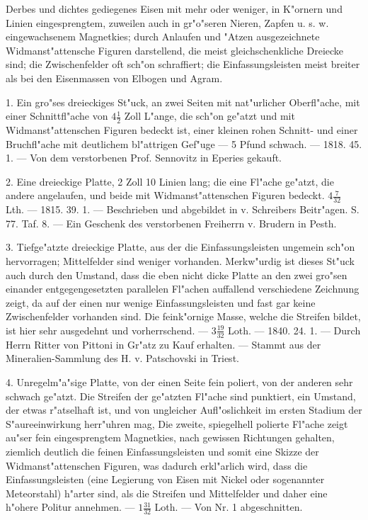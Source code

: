 \documentclass[a4paper, 11pt, oneside, polutonikogreek, german]{article}
\begin{document}
Derbes und dichtes gediegenes Eisen mit mehr oder weniger, in K"ornern und Linien eingesprengtem, zuweilen auch in gr"o"seren Nieren, Zapfen u. s. w. eingewachsenem Magnetkies; durch Anlaufen und "Atzen ausgezeichnete Widmanst"attensche Figuren darstellend, die meist gleichschenkliche Dreiecke sind; die Zwischenfelder oft sch"on schraffiert; die Einfassungsleisten meist breiter als bei den Eisenmassen von Elbogen und Agram.

1. Ein gro"ses dreieckiges St"uck, an zwei Seiten mit nat"urlicher Oberfl"ache, mit einer Schnittfl"ache von $\mathfrak{4\frac{1}{2}}$ Zoll L"ange, die sch"on ge"atzt und mit Widmanst"attenschen Figuren bedeckt ist, einer kleinen rohen Schnitt- und einer Bruchfl"ache mit deutlichem bl"attrigen Gef"uge --- 5 Pfund schwach. --- 1818. 45. 1. --- Von dem verstorbenen Prof. Sennovitz in Eperies gekauft.

2. Eine dreieckige Platte, 2 Zoll 10 Linien lang; die eine Fl"ache ge"atzt, die andere angelaufen, und beide mit Widmanst"attenschen Figuren bedeckt. $\mathfrak{4\frac{7}{32}}$ Lth. --- 1815. 39. 1. --- Beschrieben und abgebildet in v. Schreibers Beitr"agen. S. 77. Taf. 8. --- Ein Geschenk des verstorbenen Freiherrn v. Brudern in Pesth.

3. Tiefge"atzte dreieckige Platte, aus der die Einfassungsleisten ungemein sch"on hervorragen; Mittelfelder sind weniger vorhanden. Merkw"urdig ist dieses St"uck auch durch den Umstand, dass die eben nicht dicke Platte an den zwei gro"sen einander entgegengesetzten parallelen Fl"achen auffallend verschiedene Zeichnung zeigt, da auf der einen nur wenige Einfassungsleisten und fast gar keine Zwischenfelder vorhanden sind. Die feink"ornige Masse, welche die Streifen bildet, ist hier sehr ausgedehnt und vorherrschend. --- $\mathfrak{3\frac{19}{32}}$ Loth. --- 1840. 24. 1. --- Durch Herrn Ritter von Pittoni in Gr"atz zu Kauf erhalten. --- Stammt aus der Mineralien-Sammlung des H. v. Patschovski in Triest.

4. Unregelm"a"sige Platte, von der einen Seite fein poliert, von der anderen sehr schwach ge"atzt. Die Streifen der ge"atzten Fl"ache sind punktiert, ein Umstand, der etwas r"atselhaft ist, und von ungleicher Aufl"oslichkeit im ersten Stadium der S"aureeinwirkung herr"uhren mag, Die zweite, spiegelhell polierte Fl"ache zeigt au"ser fein eingesprengtem Magnetkies, nach gewissen Richtungen gehalten, ziemlich deutlich die feinen Einfassungsleisten und somit eine Skizze der Widmanst"attenschen Figuren, was dadurch erkl"arlich wird, dass die Einfassungsleisten (eine Legierung von Eisen mit Nickel oder sogenannter Meteorstahl) h"arter sind, als die Streifen und Mittelfelder und daher eine h"ohere Politur annehmen. --- $\mathfrak{1\frac{31}{32}}$ Loth. --- Von Nr. 1 abgeschnitten.
\end{document}
